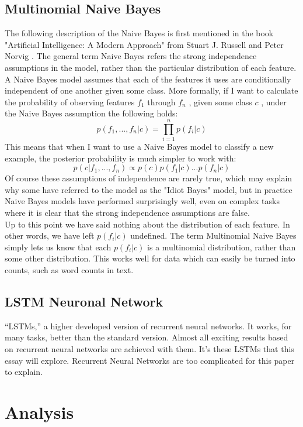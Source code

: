 \documentclass[journal]{IEEEtran}
\begin{document}
\subsection{Multinomial Naive Bayes}
\noindent The following description of the Naive Bayes is first mentioned in the book "Artificial Intelligence: A Modern Approach" from Stuart J. Russell and Peter Norvig \cite{Russell}.
The general term Naive Bayes refers the strong independence assumptions in the model, rather than the particular distribution of each feature. A Naive Bayes model assumes that each of the features it uses are conditionally independent of one another given some class. More formally, if I want to calculate the probability of observing features \(f_1\) through \(f_n\) , given some class \(c\) , under the Naive Bayes assumption the following holds:
\begin{equation}
p(f_1,..., f_n|c) = \prod_{i=1}^n p(f_i|c)
\end{equation}
This means that when I want to use a Naive Bayes model to classify a new example, the posterior probability is much simpler to work with:
\begin{equation}
p(c|f_1,...,f_n) \propto p(c)p(f_1|c)...p(f_n|c)
\end{equation}
Of course these assumptions of independence are rarely true, which may explain why some have referred to the model as the "Idiot Bayes" model, but in practice Naive Bayes models have performed surprisingly well, even on complex tasks where it is clear that the strong independence assumptions are false.\\Up to this point we have said nothing about the distribution of each feature. In other words, we have left \(p(f_i|c)\) undefined. The term Multinomial Naive Bayes simply lets us know that each \(p(f_i|c)\) is a multinomial distribution, rather than some other distribution. This works well for data which can easily be turned into counts, such as word counts in text.
\subsection{LSTM Neuronal Network}
“LSTMs,” a higher developed version of recurrent neural networks. It works, for many tasks, better than the standard version. Almost all exciting results based on recurrent neural networks are achieved with them. It’s these LSTMs that this essay will explore. Recurrent Neural Networks are too complicated for this paper to explain. 

\section{Analysis}
\end{document}
